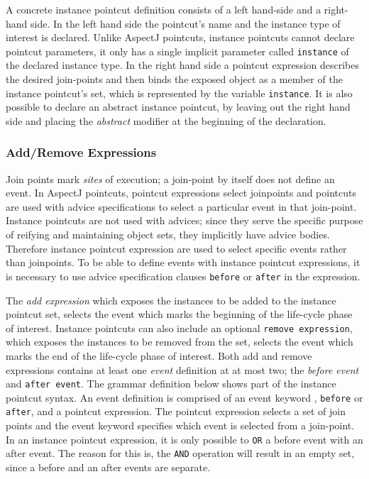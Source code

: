 \documentclass{llncs}
\begin{document}
A concrete instance pointcut definition consists of a left hand-side and a right-hand side. 
In the left hand side the pointcut's name and the instance type of interest is declared. 
Unlike AspectJ pointcuts, instance pointcuts cannot declare pointcut parameters, it only has a single implicit parameter called \texttt{instance} of the declared instance type. 
In the right hand side a pointcut expression describes the desired join-points and then binds the exposed object as a member of the instance pointcut's set, which is represented by the variable \texttt{instance}. 
It is also possible to declare an abstract instance pointcut, by leaving out the right hand side and placing the \emph{abstract} modifier at the beginning of the declaration.


\subsubsection{Add/Remove Expressions}
Join points mark \emph{sites} of execution; a join-point by itself does not define an event. 
In AspectJ pointcuts, pointcut expressions select joinpoints and pointcuts are used with advice specifications to select a particular event in that join-point.
Instance pointcuts are not used with advices; since they serve the specific purpose of reifying and maintaining object sets, they implicitly have advice bodies. 
Therefore instance pointcut expression are used to select specific events rather than joinpoints.
To be able to define events with instance pointcut expressions, it is necessary to use advice specification clauses \texttt{before} or \texttt{after} in the expression. 

The \emph{add expression} which exposes the instances to be added to the instance pointcut set, selects the event which marks the beginning of the life-cycle phase of interest. 
Instance pointcuts can also include an optional \texttt{remove expression},  which exposes the instances to be removed from the set, selects the event which marks the end of the life-cycle phase of interest.
 Both add and remove expressions contains at least one \emph{event} definition at at most two; the \emph{before event} and \texttt{after event}. The grammar definition below shows part of the instance pointcut syntax. 
An event definition is comprised of an event keyword , \texttt{before} or \texttt{after}, and a pointcut expression.
The pointcut expression selects a set of join points and the event keyword specifies which event is selected from a join-point. 
In an instance pointcut expression, it is only possible to \texttt{OR} a before event with an after event. 
The reason for this is, the \texttt{AND} operation will result in an empty set, since a before and an after events are separate.
\end{document}
